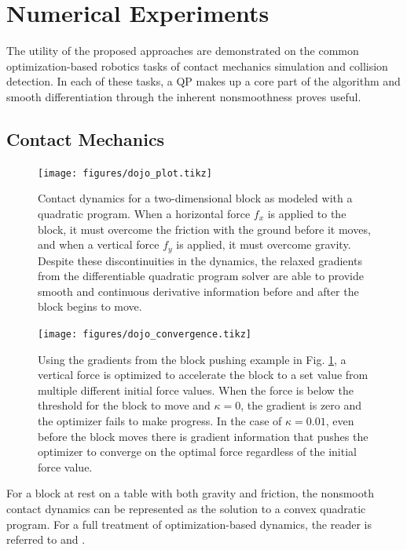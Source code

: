\section{Numerical Experiments}
The utility of the proposed approaches are demonstrated on the common optimization-based robotics tasks of contact mechanics simulation and collision detection. In each of these tasks, a QP makes up a core part of the algorithm and smooth differentiation through the inherent nonsmoothness proves useful. 
\subsection{Contact Mechanics}
    \begin{figure}[t!]
        \centering
        \hspace{1cm}
        \texttt{[image: figures/dojo\_plot.tikz]}
        \caption{Contact dynamics for a two-dimensional block as modeled with a quadratic program. When a horizontal force $f_x$ is applied to the block, it must overcome the friction with the ground before it moves, and when a vertical force $f_y$ is applied, it must overcome gravity. Despite these discontinuities in the dynamics, the relaxed gradients from the differentiable quadratic program solver are able to provide smooth and continuous derivative information before and after the block begins to move.}
        \label{qpax:fig:dojo}
    \end{figure}
    \begin{figure}
        \centering
        \texttt{[image: figures/dojo\_convergence.tikz]}
        \caption{Using the gradients from the block pushing example in Fig. \ref{qpax:fig:dojo}, a vertical force is optimized to accelerate the block to a set value from multiple different initial force values. When the force is below the threshold for the block to move and $\kappa = 0$, the gradient is zero and the optimizer fails to make progress. In the case of $\kappa=0.01$, even before the block moves there is gradient information that pushes the optimizer to converge on the optimal force regardless of the initial force value.}
        \label{qpax:fig:dojo_convergence}
    \end{figure}
For a block at rest on a table with both gravity and friction, the nonsmooth contact dynamics can be represented as the solution to a convex quadratic program. For a full treatment of optimization-based dynamics, the reader is referred to \cite{anitescu2006} and \cite{howell2022}.

